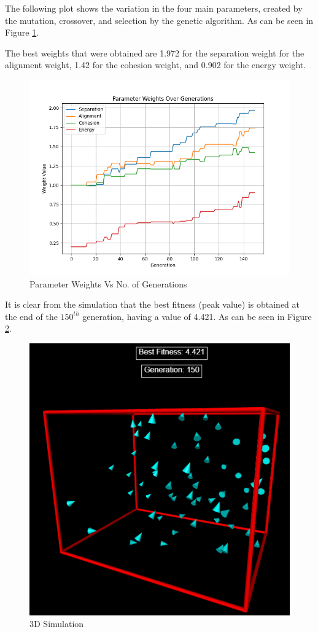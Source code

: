 \documentclass[twocolumn, a4paper, 12pt]{article}
\begin{document}
The following plot shows the variation in the four main parameters, created by the mutation, crossover, and selection by the genetic algorithm. As can be seen in Figure \ref{fig:2}.

The best weights that were obtained are 1.972 for the separation weight for the alignment weight, 1.42 for the cohesion weight, and 0.902 for the energy weight.

\begin{figure}[H]
    \centering
    \includegraphics[width=0.9\linewidth]{images/parameter_weights.png}
    \caption{Parameter Weights Vs No. of Generations}
    \label{fig:2}
\end{figure}

It is clear from the simulation that the best fitness (peak value) is obtained at the end of the $150^{th}$ generation, having a value of 4.421. As can be seen in Figure \ref{fig:3}.

\begin{figure}[H]
    \centering
    \includegraphics[width=0.8\linewidth]{simulation.png}
    \caption{3D Simulation}
    \label{fig:3}
\end{figure}
\end{document}
